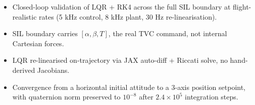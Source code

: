 \documentclass[11pt,a4paper]{article}
\begin{document}
\begin{tcolorbox}[colback=accentcolor!10,colframe=accentcolor,title=Key Outcomes]
\begin{itemize}[leftmargin=*]
    \item Closed-loop validation of LQR + RK4 across the full SIL boundary at flight-realistic rates (5 kHz control, 8 kHz plant, 30 Hz re-linearisation).
    \item SIL boundary carries $[\alpha,\beta,T]$, the real TVC command, not internal Cartesian forces.
    \item LQR re-linearised on-trajectory via JAX auto-diff + Riccati solve, no hand-derived Jacobians.
    \item Convergence from a horizontal initial attitude to a 3-axis position setpoint, with quaternion norm preserved to $10^{-8}$ after $2.4\times10^5$ integration steps.
\end{itemize}
\end{tcolorbox}

\newpage
\end{document}

